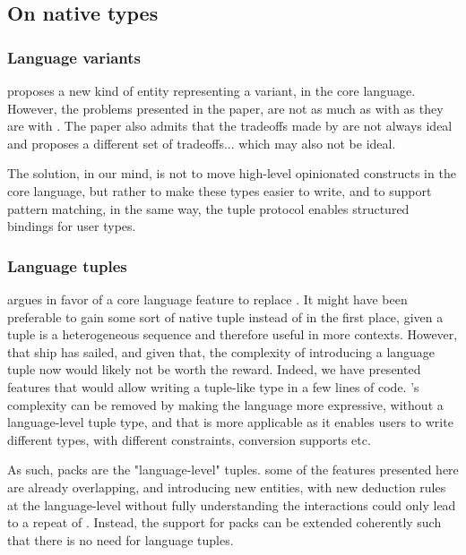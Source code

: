 \documentclass{wg21}
\begin{document}
\subsection{On native types}

\subsubsection{Language variants}

 proposes a new kind of entity representing a variant, in the core language.
However, the problems presented in the paper, are not as much as with  as they are with .
The paper also admits that the tradeoffs made by  are not always ideal and proposes a different set of tradeoffs... which may also not be ideal.

The solution, in our mind, is not to move high-level opinionated constructs in the core language, but rather to make these types easier to write,
and to support pattern matching, in the same way, the tuple protocol enables structured bindings for user types.

\subsubsection{Language tuples}

 argues in favor of a core language feature to replace .
It might have been preferable t\textbf{}o gain some sort of native tuple instead of  in the first place, given a tuple is a heterogeneous sequence and therefore useful in more contexts.
However, that ship has sailed, and given that, the complexity of introducing a language tuple now would likely not be worth the reward.
Indeed, we have presented features that would allow writing a tuple-like type in a few lines of code. 's complexity can be removed by making the language more expressive, without a language-level tuple type, and that is more applicable as it enables users to write different  types, with different constraints,
conversion supports etc.

As such, packs are the "language-level" tuples. some of the features presented here are already overlapping, and introducing new entities, with new deduction rules at the language-level without fully understanding the interactions could only
lead to a repeat of . Instead, the support for packs can be extended coherently such that there is no need for language tuples.
\end{document}
